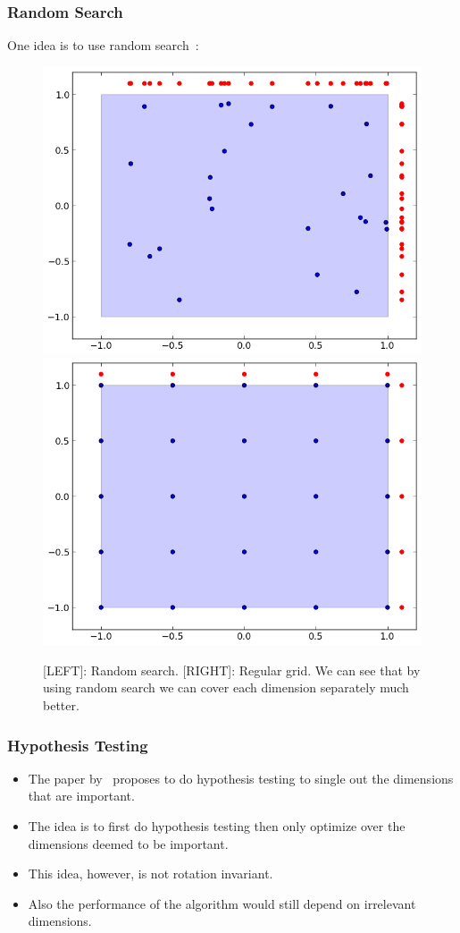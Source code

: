 \documentclass[grey]{beamer}
\begin{document}
  \begin{frame}
   \frametitle{Random Search}
   One idea is to use random search~\cite{Bergstra:2012}:
   \begin{figure}[t]
     \includegraphics[width = 0.48\columnwidth]{./figs/rand}
     \includegraphics[width = 0.48\columnwidth]{./figs/grid}
     \label{fig:ESSL_BLR}
     \caption{[LEFT]: Random search. [RIGHT]: Regular grid. We can see that
     by using random search we can cover each dimension separately much better.}
    \end{figure}
  \end{frame}
  
  \begin{frame}
  \frametitle{Hypothesis Testing}
  \begin{itemize}
   \item The paper by~\protect\cite{Chen:2012} proposes to do hypothesis testing to 
   single out the dimensions that are important. 
   \item The idea is to first do hypothesis testing then only optimize over the 
   dimensions deemed to be important.
   \item This idea, however, is not rotation invariant.
   \item Also the performance of the algorithm would still 
   depend on irrelevant dimensions.
  \end{itemize}
  \end{frame}
\end{document}
